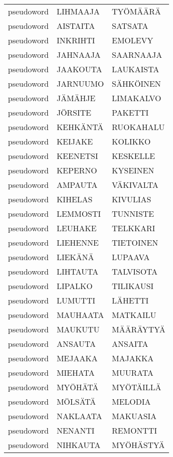 \begin{tabular}{lll}
 pseudoword &   LIHMAAJA &       TYÖMÄÄRÄ \\
 pseudoword &   AISTAITA &        SATSATA \\
 pseudoword &   INKRIHTI &        EMOLEVY \\
 pseudoword &   JAHNAAJA &      SAARNAAJA \\
 pseudoword &   JAAKOUTA &      LAUKAISTA \\
 pseudoword &   JARNUUMO &      SÄHKÖINEN \\
 pseudoword &    JÄMÄHJE &      LIMAKALVO \\
 pseudoword &    JÖRSITE &        PAKETTI \\
 pseudoword &   KEHKÄNTÄ &      RUOKAHALU \\
 pseudoword &    KEIJAKE &        KOLIKKO \\
 pseudoword &   KEENETSI &       KESKELLE \\
 pseudoword &    KEPERNO &       KYSEINEN \\
 pseudoword &    AMPAUTA &      VÄKIVALTA \\
 pseudoword &    KIHELAS &       KIVULIAS \\
 pseudoword &   LEMMOSTI &       TUNNISTE \\
 pseudoword &    LEUHAKE &       TELKKARI \\
 pseudoword &   LIEHENNE &      TIETOINEN \\
 pseudoword &    LIEKÄNÄ &        LUPAAVA \\
 pseudoword &   LIHTAUTA &      TALVISOTA \\
 pseudoword &    LIPALKO &      TILIKAUSI \\
 pseudoword &    LUMUTTI &        LÄHETTI \\
 pseudoword &   MAUHAATA &       MATKAILU \\
 pseudoword &    MAUKUTU &      MÄÄRÄYTYÄ \\
 pseudoword &    ANSAUTA &        ANSAITA \\
 pseudoword &    MEJAAKA &        MAJAKKA \\
 pseudoword &    MIEHATA &        MUURATA \\
 pseudoword &    MYÖHÄTÄ &      MYÖTÄILLÄ \\
 pseudoword &    MÖLSÄTÄ &        MELODIA \\
 pseudoword &   NAKLAATA &       MAKUASIA \\
 pseudoword &    NENANTI &       REMONTTI \\
 pseudoword &   NIHKAUTA &      MYÖHÄSTYÄ \\

\end{tabular}
